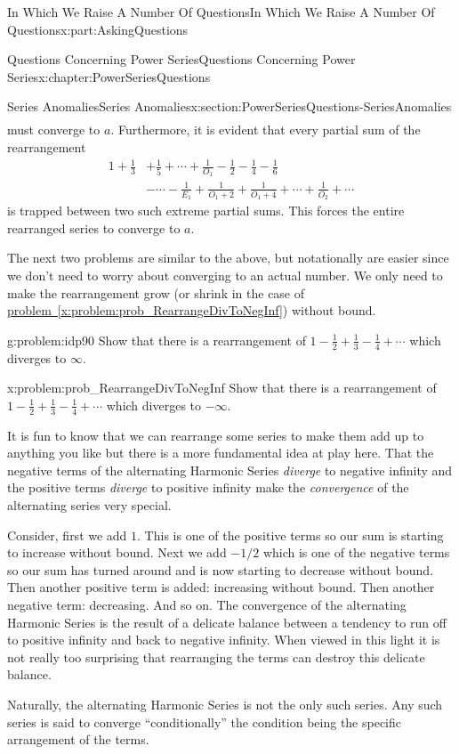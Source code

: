 \documentclass[oneside,10pt,]{book}
\newcommand{\xreffont}{\relax}
\numberwithin{equation}{section}
\newcommand{\amp}{&}
\begin{document}
\begin{partptx}{In Which We Raise A Number Of Questions}{}{In Which We Raise A Number Of Questions}{}{}{x:part:AskingQuestions}
\begin{chapterptx}{Questions Concerning Power Series}{}{Questions Concerning Power Series}{}{}{x:chapter:PowerSeriesQuestions}
\begin{sectionptx}{Series Anomalies}{}{Series Anomalies}{}{}{x:section:PowerSeriesQuestions-SeriesAnomalies}
\begin{align*}
\end{align*}
must converge to \(a\). Furthermore, it is evident that every partial sum of the rearrangement%
\begin{align*}
1+\frac{1}{3}\amp +\frac{1}{5}+\cdots+\frac{1}{O_1}-\frac{1}{2}-\frac{1}{4}- \frac{1}{6}\\
\amp -\cdots-\frac{1}{E_1}+\frac{1}{O_1+2}+\frac{1}{O_1+4}+\cdots+ \frac{1}{O_2}+\cdots
\end{align*}
is trapped between two such extreme partial sums. This forces the entire rearranged series to converge to \(a\).%
\par
The next two problems are similar to the above, but notationally are easier since we don't need to worry about converging to an actual number. We only need to make the rearrangement grow (or shrink in the case of \hyperref[x:problem:prob_RearrangeDivToNegInf]{problem~{\xreffont\ref{x:problem:prob_RearrangeDivToNegInf}}}) without bound.%
\begin{problem}{}{g:problem:idp90}%
Show that there is a rearrangement of \(1-\frac{1}{2}+\frac{1}{3}-\frac{1}{4}+\cdots\) which diverges to \(\infty\).%
\end{problem}
\begin{problem}{}{x:problem:prob_RearrangeDivToNegInf}%
Show that there is a rearrangement of \(1-\frac{1}{2}+\frac{1}{3}-\frac{1}{4}+\cdots\) which diverges to \(-\infty\).%
\end{problem}
It is fun to know that we can rearrange some series to make them add up to anything you like but there is a more fundamental idea at play here. That the negative terms of the alternating Harmonic Series \emph{diverge} to negative infinity and the positive terms \emph{diverge} to positive infinity make the \emph{convergence} of the alternating series very special.%
\par
Consider, first we add \(1\). This is one of the positive terms so our sum is starting to increase without bound. Next we add \(-1/2\) which is one of the negative terms so our sum has turned around and is now starting to decrease without bound. Then another positive term is added: increasing without bound. Then another negative term: decreasing. And so on. The convergence of the alternating Harmonic Series is the result of a delicate balance between a tendency to run off to positive infinity and back to negative infinity. When viewed in this light it is not really too surprising that rearranging the terms can destroy this delicate balance.%
\par
Naturally, the alternating Harmonic Series is not the only such series. Any such series is said to converge ``conditionally'' \textemdash{} the condition being the specific arrangement of the terms.%

\end{sectionptx}
\end{chapterptx}
\end{partptx}
\end{document}
